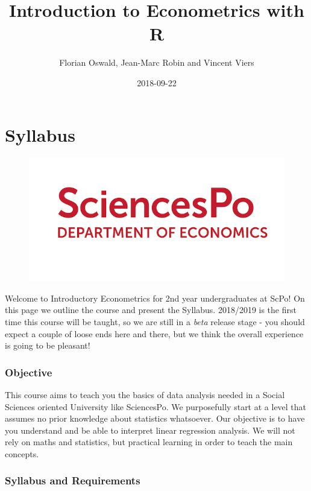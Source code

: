 \documentclass[]{book}
\title{Introduction to Econometrics with R}
\author{Florian Oswald, Jean-Marc Robin and Vincent Viers}
\date{2018-09-22}
\theoremstyle{definition}
\theoremstyle{definition}
\theoremstyle{definition}
\theoremstyle{remark}
\begin{document}
\maketitle

{
\setcounter{tocdepth}{1}
\tableofcontents
}
\chapter*{Syllabus}\label{syllabus}

\begin{figure}
\centering
\includegraphics{ScPo.jpg}
\caption{}
\end{figure}

Welcome to Introductory Econometrics for 2nd year undergraduates at
ScPo! On this page we outline the course and present the Syllabus.
2018/2019 is the first time this course will be taught, so we are still
in a \emph{beta} release stage - you should expect a couple of loose
ends here and there, but we think the overall experience is going to be
pleasant!

\subsection*{Objective}\label{objective}

This course aims to teach you the basics of data analysis needed in a
Social Sciences oriented University like SciencesPo. We purposefully
start at a level that assumes no prior knowledge about statistics
whatsoever. Our objective is to have you understand and be able to
interpret linear regression analysis. We will not rely on maths and
statistics, but practical learning in order to teach the main concepts.

\subsection*{Syllabus and Requirements}\label{syllabus-and-requirements}
\end{document}
